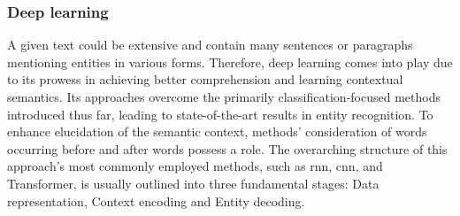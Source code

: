 \subsubsection*{Deep learning}
\label{subsubsec:deep-learning}
A given text could be extensive and contain many sentences or paragraphs mentioning entities in various forms. Therefore, deep learning comes into play due to its prowess in achieving better comprehension and learning contextual semantics. Its approaches overcome the primarily classification-focused methods introduced thus far, leading to state-of-the-art results in entity recognition. To enhance elucidation of the semantic context, methods' consideration of words occurring before and after words possess a role. The overarching structure of this approach's most commonly employed methods, such as \acrfull{rnn}, \acrfull{cnn}, and Transformer, is usually outlined into three fundamental stages: Data representation, Context encoding and Entity decoding.

